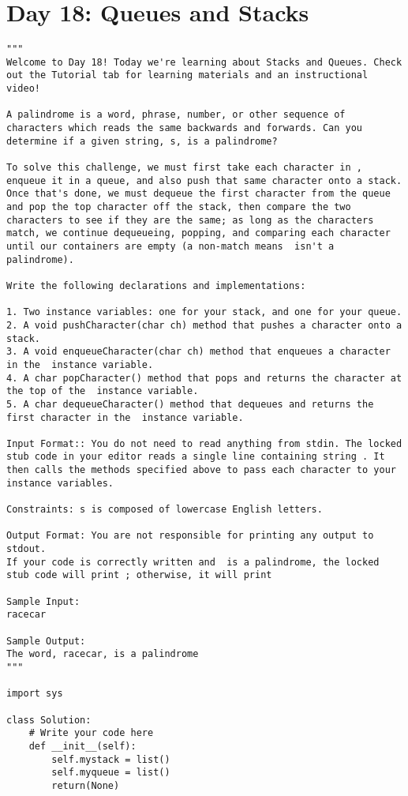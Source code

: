 \documentclass[11pt,a4paper]{article}
\begin{document}
\section{Day 18: Queues and Stacks}
\begin{lstlisting}
"""
Welcome to Day 18! Today we're learning about Stacks and Queues. Check out the Tutorial tab for learning materials and an instructional video!

A palindrome is a word, phrase, number, or other sequence of characters which reads the same backwards and forwards. Can you determine if a given string, s, is a palindrome?

To solve this challenge, we must first take each character in , enqueue it in a queue, and also push that same character onto a stack. Once that's done, we must dequeue the first character from the queue and pop the top character off the stack, then compare the two characters to see if they are the same; as long as the characters match, we continue dequeueing, popping, and comparing each character until our containers are empty (a non-match means  isn't a palindrome).

Write the following declarations and implementations:

1. Two instance variables: one for your stack, and one for your queue.
2. A void pushCharacter(char ch) method that pushes a character onto a stack.
3. A void enqueueCharacter(char ch) method that enqueues a character in the  instance variable.
4. A char popCharacter() method that pops and returns the character at the top of the  instance variable.
5. A char dequeueCharacter() method that dequeues and returns the first character in the  instance variable.

Input Format:: You do not need to read anything from stdin. The locked stub code in your editor reads a single line containing string . It then calls the methods specified above to pass each character to your instance variables.

Constraints: s is composed of lowercase English letters.

Output Format: You are not responsible for printing any output to stdout. 
If your code is correctly written and  is a palindrome, the locked stub code will print ; otherwise, it will print 

Sample Input:
racecar

Sample Output:
The word, racecar, is a palindrome
"""

import sys

class Solution:
    # Write your code here
    def __init__(self):
        self.mystack = list()
        self.myqueue = list()
        return(None)


\end{lstlisting}
\end{document}
